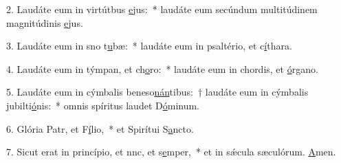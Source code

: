 2. Laudáte eum in virtútbus \uline{e}jus:~* laudáte eum secúndum multitúdinem magnitúdinis \uline{e}jus.\par 
3. Laudáte eum in sno t\uline{u}bæ:~* laudáte eum in psaltério, et c\uline{í}thara.\par 
4. Laudáte eum in týmpan, et ch\uline{o}ro:~* laudáte eum in chordis, et \uline{ó}rgano.\par 
5. Laudáte eum in cýmbalis beneso\uline{nán}tibus:~† laudáte eum in cýmbalis jubilti\uline{ó}nis:~* omnis spíritus laudet D\uline{ó}minum.\par 
6. Glória Patr, et F\uline{í}lio,~* et Spirítui S\uline{a}ncto.\par 
7. Sicut erat in princípio, et nnc, et s\uline{e}mper,~* et in sǽcula sæculórum. \uline{A}men.\par 
